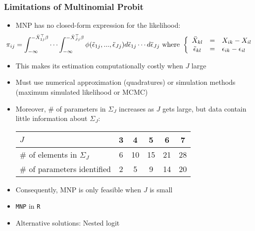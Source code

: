 \documentclass{beamer}
\begin{document}
\begin{frame}
\frametitle{Limitations of Multinomial Probit}
\begin{itemize}
  \item MNP has no closed-form expression for the \alert{likelihood}:
{\footnotesize
      $$ \hspace{-.2in} \pi_{ij} = \int_{-\infty}^{-\ddot{X}_{1j}^\top \beta}
        \cdots \int_{-\infty}^{-\ddot{X}_{Jj}^\top\beta}
        \phi(\ddot{\epsilon}_{1j},...,\ddot{\epsilon}_{Jj})
        d\ddot{\epsilon}_{1j} \cdots d\ddot{\epsilon}_{Jj}
        \ \text{where} \ \left\{ \begin{array}{ccl}
          \ddot{X}_{kl} & = & X_{ik} - X_{il} \\
         \ddot{\epsilon}_{kl} & = & \epsilon_{ik} - \epsilon_{il} \end{array} \right.
        $$
}
 \item This makes its estimation computationally costly when $J$ large
 \item Must use numerical approximation (quadratures) or simulation
 methods (maximum simulated likelihood or MCMC)
\medskip
\pause
 \item Moreover, \# of parameters in $\Sigma_J$ increases as $J$ gets large,
 but data contain little information about $\Sigma_J$:
 \medskip
 {\small
 \begin{center}
 \begin{tabular}{l|ccccc} \hline
 $J$ & 3 & 4 & 5 & 6 & 7 \\ \hline
 \# of elements in $\Sigma_J$ & 6 & 10 & 15 & 21 & 28 \\
 \# of parameters identified & 2 & 5 & 9 & 14 & 20 \\ \hline
 \end{tabular}
 \end{center}
 }
\bigskip
\pause
\item Consequently, MNP is only feasible when $J$ is small

\medskip
\pause
\item {\tt MNP} in {\tt R}
\item Alternative solutions: Nested logit
\end{itemize}
\end{frame}
\end{document}
